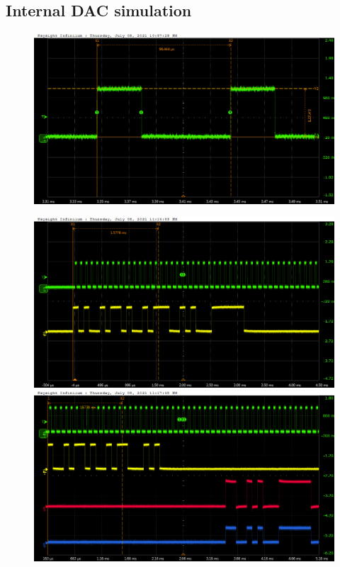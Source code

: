 \subsection{Internal DAC simulation}\label{dactests}

\begin{figure}[H]
	\centering
	\includegraphics[width=0.7\linewidth]{IMG/ch5/probe/09-08-2021_clock-specks}
	\caption{}
	\label{fig:clockspecs}
\end{figure}


\begin{figure}[H]
	\centering
	\begin{minipage}{.5\textwidth}
		\centering
		\includegraphics[width=.99\linewidth]{IMG/ch5/probe/09-08-2021_ch05-write63-baselinedac1}
		\caption{}
		\label{fig:ch05write63}
	\end{minipage}%
	\begin{minipage}{.5\textwidth}
		\centering
		\includegraphics[width=.99\linewidth]{IMG/ch5/probe/09-08-2021_ch05-read63-baselinedac1}
		\caption{}
		\label{fig:ch05read63}
	\end{minipage}
\end{figure}


